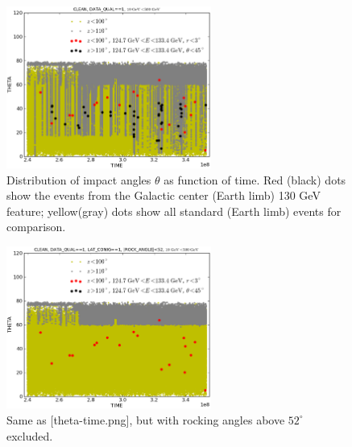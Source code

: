 \documentclass[aps,twocolumn,prd,superscriptaddress,showpacs,nofootinbib,fixfloat]{revtex4}
\begin{document}
\begin{figure}[p]
\centering
\includegraphics[width=0.6\textwidth]{plots/theta-time.ps}
\caption{Distribution of impact angles $\theta$ as function of
time. Red (black) dots show the events from the Galactic center (Earth limb)
130 GeV feature; yellow(gray) dots show all standard (Earth limb) events for
comparison.
}
\label{fig:cw3}
\end{figure}

\begin{figure}[p]
\centering
\includegraphics[width=0.6\textwidth]{plots/theta-time-rock52.ps}
\caption{Same as [theta-time.png], but with rocking angles above
$52^\circ$ excluded.
}
\label{fig:cw4}
\end{figure}
\end{document}
